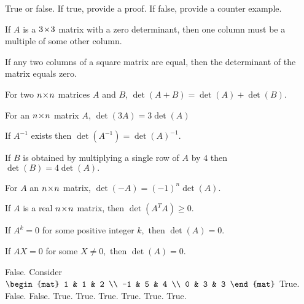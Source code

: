 
\begin{Exercise}[
name={},
title={}, 
difficulty=0,
origin={\cite{KK}}]
True or false. If true, provide a proof. If false, provide a counter example. 

\Question If $A$ is a $3 \! \times \! 3$ matrix with a zero determinant, then one
column must be a multiple of some other column.

\Question If any two columns of a square matrix are equal, then the determinant
of the matrix equals zero.

\Question For two $n \! \times \! n$ matrices $A$ and $B$, $\det \left( A+B\right)
=\det \left( A\right) +\det \left( B\right) .$

\Question For an $n \! \times \! n$ matrix $A$, $\det \left( 3A\right) =3\det \left(
A\right) $

\Question If $A^{-1}$ exists then $\det \left( A^{-1}\right) =\det \left(
A\right) ^{-1}.$

\Question If $B$ is obtained by multiplying a single row of $A$ by $4$ then $%
\det \left( B\right) =4\det \left( A\right) .$

\Question For $A$ an $n \! \times \! n$ matrix, $\det \left( -A\right) =\left(
-1\right) ^{n}\det \left( A\right) .$

\Question If $A$ is a real $n \! \times \! n$ matrix, then $\det \left( A^{T}A\right)
\geq 0.$

\Question If $A^{k}=0$ for some positive integer $k,$ then $\det \left(
A\right) =0.$

\Question If $AX=0$ for some $X \neq 0,$ then $\det \left(
A\right) =0.$

\end{Exercise}

\begin{Answer}
\Question False. Consider 
$\begin{mat}
1 & 1 & 2 \\
-1 & 5 & 4 \\
0 & 3 & 3
\end{mat}$
\Question True.
\Question False.
\Question False.
\Question True.
\Question True.
\Question True.
\Question True.
\Question True.
\Question True.
\end{Answer}

